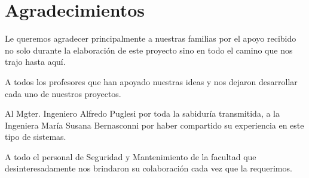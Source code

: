  \markboth{}{}
\pagestyle{empty}

\chapter*{Agradecimientos}

Le queremos agradecer principalmente a nuestras familias por el apoyo recibido no
solo durante la elaboración de este proyecto sino en todo el camino que nos 
trajo hasta aquí.

A todos los profesores que han apoyado nuestras ideas y nos dejaron desarrollar 
cada uno de nuestros proyectos.

Al Mgter. Ingeniero Alfredo Puglesi por toda la sabiduría transmitida, a la 
Ingeniera María Susana Bernasconni por haber compartido su experiencia en 
este tipo de sistemas.

A todo el personal de Seguridad y Mantenimiento de la facultad que desinteresadamente
nos brindaron su colaboración cada vez que la requerimos.